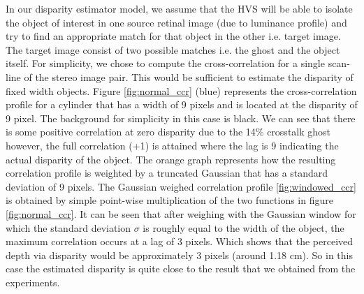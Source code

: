 In our disparity estimator model, we assume that the HVS will be able to isolate the object of interest in one source retinal image (due to luminance profile) and try to find an appropriate match for that object in the other i.e. target image. The target image consist of two possible matches i.e. the ghost and the object itself. For simplicity, we chose to compute the cross-correlation for a single scan-line of the stereo image pair. This would be sufficient to estimate the disparity of fixed width objects. Figure \ref{fig:normal_ccr} (blue) represents the cross-correlation profile for a cylinder that has a width of 9 pixels and is located at the disparity of 9 pixel. The background for simplicity in this case is black. We can see that there is some positive correlation at zero disparity due to the 14\% crosstalk ghost however, the full correlation (+1) is attained where the lag is 9 indicating the actual disparity of the object. The orange graph represents how the resulting correlation profile is weighted by a truncated Gaussian that has a standard deviation of 9 pixels. The Gaussian weighed correlation profile \ref{fig:windowed_ccr} is obtained by simple point-wise multiplication of the two functions in figure \ref{fig:normal_ccr}. It can be seen that after weighing with the Gaussian window for which the standard deviation $\sigma$ is roughly equal to the width of the object, the maximum correlation occurs at a lag of 3 pixels. Which shows that the perceived depth via disparity would be approximately 3 pixels (around 1.18 cm). So in this case the estimated disparity is quite close to the result that we obtained from the experiments.

